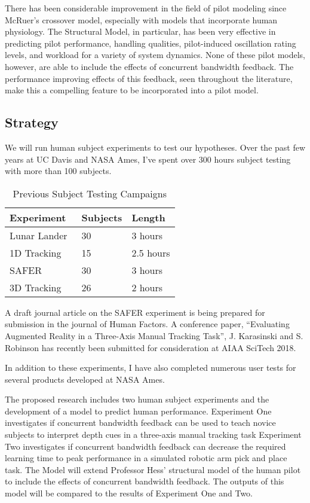\documentclass[float=false, crop=false]{standalone}
\begin{document}
There has been considerable improvement in the field of pilot modeling since McRuer's crossover model, especially with models that incorporate human physiology.
The Structural Model, in particular, has been very effective in predicting pilot performance, handling qualities, pilot-induced oscillation rating levels, and workload for a variety of system dynamics.
None of these pilot models, however, are able to include the effects of concurrent bandwidth feedback.
The performance improving effects of this feedback, seen throughout the literature, make this a compelling feature to be incorporated into a pilot model.


\subsection{Strategy}
We will run human subject experiments to test our hypotheses.
Over the past few years at UC Davis and NASA Ames, I’ve spent over 300 hours subject testing with more than 100 subjects.

\begin{table}[tb]
\centering
\caption{Previous Subject Testing Campaigns}
\label{table:mcruer1974a}
\small
\begin{tabular}{lll}
\toprule
Experiment   & Subjects & Length \\
\midrule
Lunar Lander~\cite{Karasinski2016, Karasinski2016Masters} & 30       & 3 hours \\
1D Tracking~\cite{Karasinski2016Masters} & 15       & 2.5 hours \\	
SAFER~\cite{Karasinski2016Masters, Karasinski2017}		   & 30       & 3 hours \\
3D Tracking  					   & 26       & 2 hours \\
\bottomrule
\end{tabular}
\end{table}

A draft journal article on the SAFER experiment is being prepared for submission in the journal of Human Factors.
A conference paper, ``Evaluating Augmented Reality in a Three-Axis Manual Tracking Task'', J. Karasinski and S. Robinson has recently been submitted for consideration at AIAA SciTech 2018.


In addition to these experiments, I have also completed numerous user tests for several products developed at NASA Ames.

The proposed research includes two human subject experiments and the development of a model to predict human performance.
Experiment One investigates if concurrent bandwidth feedback can be used to teach novice subjects to interpret depth cues in a three-axis manual tracking task
Experiment Two investigates if concurrent bandwidth feedback can decrease the required learning time to peak performance in a simulated robotic arm pick and place task.
The Model will extend Professor Hess’ structural model of the human pilot to include the effects of concurrent bandwidth feedback.
The outputs of this model will be compared to the results of Experiment One and Two.
\end{document}
